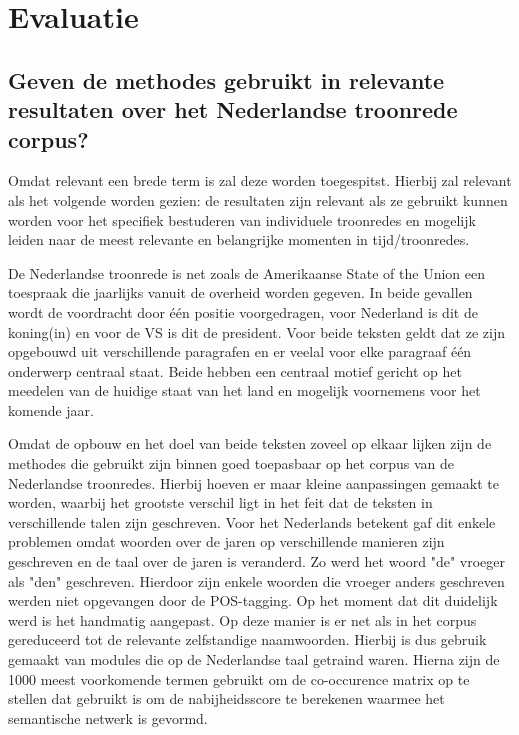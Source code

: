 \section{Evaluatie}
\label{sec:eva}

\subsection{Geven de methodes gebruikt in \cite{state} relevante resultaten over het Nederlandse troonrede corpus?}

Omdat relevant een brede term is zal deze worden toegespitst. Hierbij zal relevant als het volgende worden gezien: de resultaten zijn relevant als ze gebruikt kunnen worden voor het specifiek bestuderen van individuele troonredes en mogelijk leiden naar de meest relevante en belangrijke momenten in tijd/troonredes. 

De Nederlandse troonrede is net zoals de Amerikaanse State of the Union een toespraak die jaarlijks vanuit de overheid worden gegeven. In beide gevallen wordt de voordracht door één positie voorgedragen, voor Nederland is dit de koning(in) en voor de VS is dit de president. Voor beide teksten geldt dat ze zijn opgebouwd uit verschillende paragrafen en er veelal voor elke paragraaf één onderwerp centraal staat. Beide hebben een centraal motief gericht op het meedelen van de huidige staat van het land en mogelijk voornemens voor het komende jaar.

Omdat de opbouw en het doel van beide teksten zoveel op elkaar lijken zijn de methodes die gebruikt zijn binnen \cite{state} goed toepasbaar op het corpus van de Nederlandse troonredes. Hierbij hoeven er maar kleine aanpassingen gemaakt te worden, waarbij het grootste verschil ligt in het feit dat de teksten in verschillende talen zijn geschreven. Voor het Nederlands betekent gaf dit enkele problemen omdat woorden over de jaren op verschillende manieren zijn geschreven en de taal over de jaren is veranderd. Zo werd het woord "de" vroeger als "den" geschreven. Hierdoor zijn enkele woorden die vroeger anders geschreven werden niet opgevangen door de POS-tagging. Op het moment dat dit duidelijk werd is het handmatig aangepast. Op deze manier is er net als in \cite{state} het corpus gereduceerd tot de relevante zelfstandige naamwoorden. Hierbij is dus gebruik gemaakt van modules die op de Nederlandse taal getraind waren. Hierna zijn de 1000 meest voorkomende termen gebruikt om de co-occurence matrix op te stellen dat gebruikt is om de nabijheidsscore te berekenen waarmee het semantische netwerk is gevormd.

